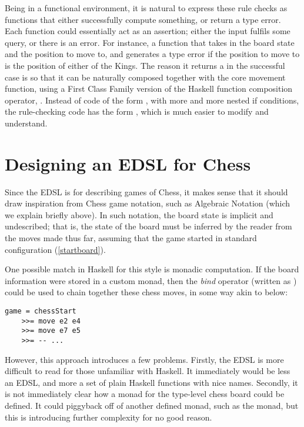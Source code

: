 Being in a functional environment, it is natural to express these rule checks as functions that either successfully compute something, or return a type error. Each function could essentially act as an assertion; either the input fulfils some query, or there is an error. For instance, a function  that takes in the board state and the position to move to, and generates a type error if the position to move to is the position of either of the Kings. The reason it returns a  in the successful case is so that it can be naturally composed together with the core movement function, using a First Class Family version of the Haskell function composition operator, . Instead of code of the form , with more and more nested if conditions, the rule-checking code has the form , which is much easier to modify and understand.

\section{Designing an EDSL for Chess}

Since the EDSL is for describing games of Chess, it makes sense that it should draw inspiration from Chess game notation, such as Algebraic Notation (which we explain briefly above). In such notation, the board state is implicit and undescribed; that is, the state of the board must be inferred by the reader from the moves made thus far, assuming that the game started in standard configuration (\cref{startboard}).

One possible match in Haskell for this style is monadic computation. If the board information were stored in a custom monad, then the \emph{bind} operator (written as \inline{>>=)}) could be used to chain together these chess moves, in some way akin to below:

\begin{lstlisting}
game = chessStart
    >>= move e2 e4
    >>= move e7 e5
    >>= -- ...
\end{lstlisting}

However, this approach introduces a few problems. Firstly, the EDSL is more difficult to read for those unfamiliar with Haskell. It immediately would be less an EDSL, and more a set of plain Haskell functions with nice names. Secondly, it is not immediately clear how a monad for the type-level chess board could be defined. It could piggyback off of another defined monad, such as the  monad, but this is introducing further complexity for no good reason.

